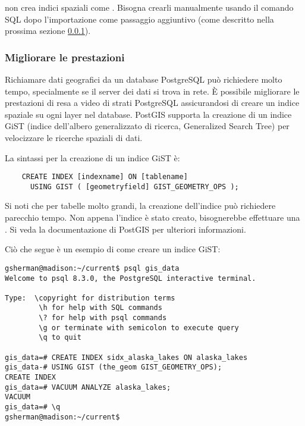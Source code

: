  non crea indici spaziali come . Bisogna
crearli manualmente usando il comando SQL  dopo
l'importazione come passaggio aggiuntivo (come descritto nella prossima
sezione \ref{label_improve}).

\subsubsection{Migliorare le prestazioni} \label{label_improve}

Richiamare dati geografici da un database PostgreSQL può richiedere molto
tempo, specialmente se il server dei dati si trova in rete. È possibile
migliorare le prestazioni di resa a video di strati PostgreSQL assicurandosi
di creare un  indice spaziale su ogni layer nel
database. PostGIS supporta la creazione di un  indice GiST
(indice dell'albero generalizzato di ricerca, Generalized Search Tree) per
velocizzare le ricerche spaziali di dati.

La sintassi per la creazione di un indice GiST è:

\begin{verbatim}
    CREATE INDEX [indexname] ON [tablename] 
      USING GIST ( [geometryfield] GIST_GEOMETRY_OPS );
\end{verbatim}

Si noti che per tabelle molto grandi, la creazione dell'indice può richiedere
parecchio tempo. Non appena l'indice è stato creato, bisognerebbe effettuare
una . Si veda la documentazione di PostGIS
\cite{PostGISweb} per ulteriori informazioni.

Ciò che segue è un esempio di come creare un indice GiST:
\begin{verbatim}
gsherman@madison:~/current$ psql gis_data
Welcome to psql 8.3.0, the PostgreSQL interactive terminal.

Type:  \copyright for distribution terms
        \h for help with SQL commands
        \? for help with psql commands
        \g or terminate with semicolon to execute query
        \q to quit

gis_data=# CREATE INDEX sidx_alaska_lakes ON alaska_lakes
gis_data-# USING GIST (the_geom GIST_GEOMETRY_OPS);
CREATE INDEX
gis_data=# VACUUM ANALYZE alaska_lakes;
VACUUM
gis_data=# \q
gsherman@madison:~/current$
\end{verbatim}

